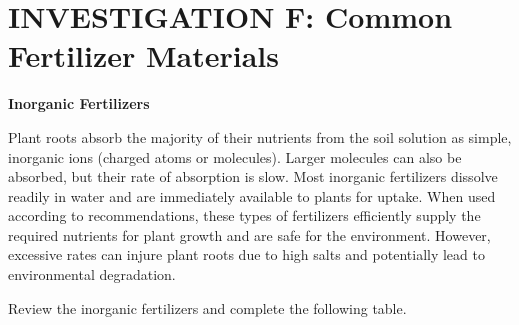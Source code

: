 \documentclass[
  letterpaper,
  twocolumn,
  portrait]{scrbook}
\begin{document}
\hypertarget{investigation-f-common-fertilizer-materials}{%
\section{INVESTIGATION F: Common Fertilizer
Materials}\label{investigation-f-common-fertilizer-materials}}

\textbf{Inorganic Fertilizers}

Plant roots absorb the majority of their nutrients from the soil
solution as simple, inorganic ions (charged atoms or molecules). Larger
molecules can also be absorbed, but their rate of absorption is slow.
Most inorganic fertilizers dissolve readily in water and are immediately
available to plants for uptake. When used according to recommendations,
these types of fertilizers efficiently supply the required nutrients for
plant growth and are safe for the environment. However, excessive rates
can injure plant roots due to high salts and potentially lead to
environmental degradation.

Review the inorganic fertilizers and complete the following table.

 
  \providecommand{\huxb}[2]{\arrayrulecolor[RGB]{#1}\global\arrayrulewidth=#2pt}
  \providecommand{\huxvb}[2]{\color[RGB]{#1}\vrule width #2pt}
  \providecommand{\huxtpad}[1]{\rule{0pt}{#1}}
  \providecommand{\huxbpad}[1]{\rule[-#1]{0pt}{#1}}
\end{document}

